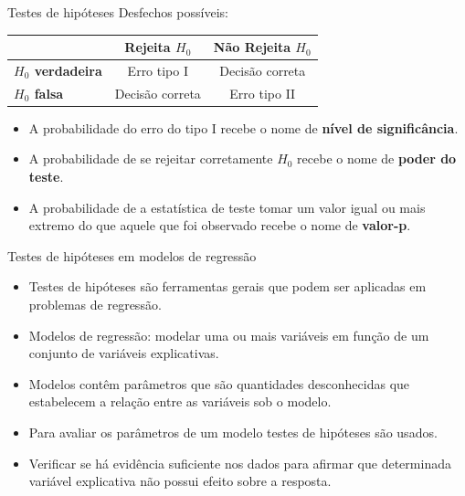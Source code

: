 \documentclass[
  ignorenonframetext,
  serif,
  professionalfont,
  usenames,
  dvipsnames,
  aspectratio = 169]{beamer}
\begin{document}
\begin{frame}{Testes de hipóteses}
\protect\hypertarget{testes-de-hipuxf3teses-3}{}
Desfechos possíveis:

\begin{table}[]
\begin{tabular}{l|cc}
\hline
\multicolumn{1}{c|}{}    & \textbf{Rejeita $H_0$} & \textbf{Não Rejeita $H_0$} \\ \hline
\textbf{$H_0$ verdadeira} & Erro tipo I           & Decisão correta           \\
\textbf{$H_0$ falsa}      & Decisão correta       & Erro tipo II              \\ \hline
\end{tabular}
\label{tab:my-table}
\end{table}

\begin{itemize}
    \itemsep 2ex
  
  \item A probabilidade do erro do tipo I recebe o nome de \textbf{nível de significância}.
  
  \item A probabilidade de se rejeitar corretamente $H_0$ recebe o nome de \textbf{poder do teste}.
  
  \item A probabilidade de a estatística de teste tomar um valor igual ou mais extremo do que aquele que foi observado recebe o nome de \textbf{valor-p}.
    
  \end{itemize}
\end{frame}

\begin{frame}{Testes de hipóteses em modelos de regressão}
\protect\hypertarget{testes-de-hipuxf3teses-em-modelos-de-regressuxe3o-2}{}
\begin{itemize}
  \itemsep 2ex

  \item Testes de hipóteses são ferramentas gerais que podem ser aplicadas em problemas de regressão.
  
  \item Modelos de regressão: modelar uma ou mais variáveis em função de um conjunto de variáveis explicativas. 

  \item Modelos contêm parâmetros que são quantidades desconhecidas que estabelecem a relação entre as variáveis sob o modelo. 

  \item Para avaliar os parâmetros de um modelo testes de hipóteses são usados.
  
  \item Verificar se há evidência suficiente nos dados para afirmar que determinada variável explicativa não possui efeito sobre a resposta.

\end{itemize}
\end{frame}
\end{document}
